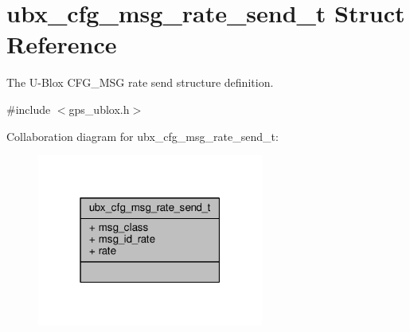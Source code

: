 \hypertarget{structubx__cfg__msg__rate__send__t}{\section{ubx\+\_\+cfg\+\_\+msg\+\_\+rate\+\_\+send\+\_\+t Struct Reference}
\label{structubx__cfg__msg__rate__send__t}
}


The U-\/\+Blox C\+F\+G\+\_\+\+M\+S\+G rate send structure definition.  




{\ttfamily \#include $<$gps\+\_\+ublox.\+h$>$}



Collaboration diagram for ubx\+\_\+cfg\+\_\+msg\+\_\+rate\+\_\+send\+\_\+t\+:
\nopagebreak
\begin{figure}[H]
\begin{center}
\leavevmode
\includegraphics[width=211pt]{structubx__cfg__msg__rate__send__t__coll__graph}
\end{center}
\end{figure}
